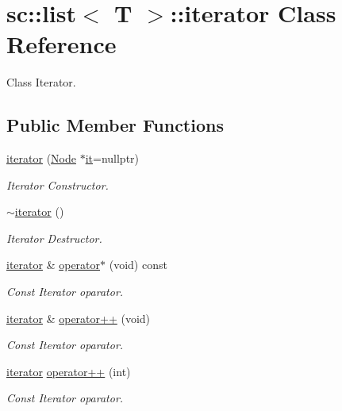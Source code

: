 \hypertarget{classsc_1_1list_1_1iterator}{}\section{sc\+:\+:list$<$ T $>$\+:\+:iterator Class Reference}
\label{classsc_1_1list_1_1iterator}


Class Iterator.  


\subsection*{Public Member Functions}
\begin{DoxyCompactItemize}
\item 
\hyperlink{classsc_1_1list_1_1iterator_a70e7732135929fcc70a2d1bc79596454}{iterator} (\hyperlink{structsc_1_1list_1_1_node}{Node} $\ast$\hyperlink{classsc_1_1list_1_1iterator_aea61cc70ea3b0c69e1e7eee809bf4cef}{it}=nullptr)
\begin{DoxyCompactList}\small\item\em Iterator Constructor. \end{DoxyCompactList}\item 
\hyperlink{classsc_1_1list_1_1iterator_a683f8fb965f0a3d5c5cf5b906aadbb26}{$\sim$iterator} ()
\begin{DoxyCompactList}\small\item\em Iterator Destructor. \end{DoxyCompactList}\item 
\hyperlink{classsc_1_1list_1_1iterator}{iterator} \& \hyperlink{classsc_1_1list_1_1iterator_af844d846b7182ef0ac0319ac1908e0b9}{operator$\ast$} (void) const
\begin{DoxyCompactList}\small\item\em Const Iterator oparator. \end{DoxyCompactList}\item 
\hyperlink{classsc_1_1list_1_1iterator}{iterator} \& \hyperlink{classsc_1_1list_1_1iterator_a7c1db4853ef2e119226c4607fda73084}{operator++} (void)
\begin{DoxyCompactList}\small\item\em Const Iterator oparator. \end{DoxyCompactList}\item 
\hyperlink{classsc_1_1list_1_1iterator}{iterator} \hyperlink{classsc_1_1list_1_1iterator_aa4c960f7ec3b2914da2fdbf24ae18412}{operator++} (int)
\begin{DoxyCompactList}\small\item\em Const Iterator oparator. \end{DoxyCompactList}\item 

\end{DoxyCompactItemize}

